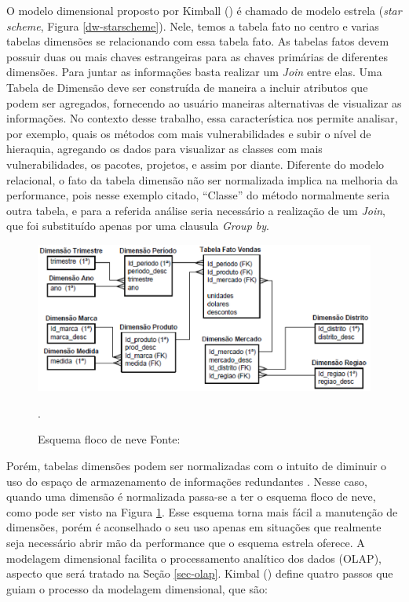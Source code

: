 O modelo dimensional proposto por Kimball (\citeyear{kimball2002}) é chamado de modelo estrela (\emph{star scheme}, Figura \ref{dw-starscheme}). Nele, temos a tabela fato no centro e varias tabelas dimensões se relacionando com essa tabela fato. As tabelas fatos devem possuir duas ou mais chaves estrangeiras para as chaves primárias de diferentes dimensões. Para juntar as informações basta realizar um \emph{Join} entre elas.
%
Uma Tabela de Dimensão deve ser construída de maneira a incluir atributos que podem ser agregados, fornecendo ao usuário maneiras alternativas de visualizar as informações. No contexto desse trabalho, essa característica nos permite analisar, por exemplo, quais os métodos com mais vulnerabilidades e subir o nível de hieraquia, agregando os dados para visualizar as classes com mais vulnerabilidades, os pacotes, projetos, e assim por diante. Diferente do modelo relacional, o fato da tabela dimensão não ser normalizada implica na melhoria da performance, pois nesse exemplo citado, “Classe” do método normalmente seria outra tabela, e para a referida análise seria necessário a realização de um \emph{Join}, que foi substituído apenas por uma clausula \emph{Group by}.

\begin{figure}[!htb]
 	\centering
 		\includegraphics[scale=1]{figuras/dw-modelo-flocodeneve}
 		\caption{Esquema floco de neve  Fonte: \cite{Wagner2012}}.
 		\label{dw-snowflackscheme}
 \end{figure}

Porém, tabelas dimensões podem ser normalizadas com o intuito de diminuir o uso do espaço de armazenamento de informações redundantes \cite{kimball2002}. Nesse caso, quando uma dimensão é normalizada passa-se a ter o esquema floco de neve, como pode ser visto na Figura \ref{dw-snowflackscheme}. Esse esquema torna mais fácil a manutenção de dimensões, porém é aconselhado o seu uso apenas em situações que realmente seja necessário abrir mão da performance que o esquema estrela oferece.
%
A modelagem dimensional facilita o processamento analítico dos dados (OLAP), aspecto que será tratado na Seção \ref{sec-olap}.
%
Kimbal (\citeyear{kimball2002}) define quatro passos que guiam o processo da modelagem dimensional, que são:

